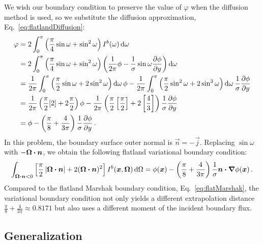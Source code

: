 \thesisclearpage
We wish our boundary condition to preserve the value of
$\varphi$ when the diffusion method is used, so we substitute the diffusion
approximation, Eq.~\eqref{eq:flatlandDiffusion}:
\begin{align*}
 \varphi &= 2\int_{0}^{\pi} \left( \frac{\pi}{4} \sin\omega + \sin^2\omega \right)
 I^b(\omega) \mathop{}\!\mathrm{d}\omega
 \\
 &= 
  2\int_{0}^{\pi} \left( \frac{\pi}{4} \sin\omega + \sin^2\omega \right)
 \left( \frac{1}{2\pi} \phi -
  \frac{1}{\sigma} \sin\omega \frac{\partial \phi}{\partial y}\right)\mathop{}\!\mathrm{d}\omega
\\
 &= 
\frac{1}{2\pi} \int_{0}^{\pi} \left( \frac{\pi}{2} \sin\omega + 2 \sin^2\omega
\right)\mathop{}\!\mathrm{d}\omega
 \,\phi -
 \frac{1}{2\pi} \int_{0}^{\pi} \left( \frac{\pi}{2} \sin^2\omega + 2 \sin^3\omega \right)\mathop{}\!\mathrm{d}\omega
  \,\frac{1}{\sigma} \frac{\partial \phi}{\partial y}
  \\
 &= 
 \frac{1}{2\pi} \left( \frac{\pi}{2} [2] + 2 \frac{\pi}{2}
\right) \phi
-
\frac{1}{2\pi} \left( \frac{\pi}{2} \left[ \frac{\pi}{2} \right] + 2 \left[
\frac{4}{3} \right] \right) \frac{1}{\sigma} \frac{\partial \phi}{\partial y}
\\
 &= 
  \phi
- \left( \frac{\pi}{8} + \frac{4}{3\pi} \right) \frac{1}{\sigma} \frac{\partial \phi}{\partial y}
\,.
\end{align*}
In this problem, the boundary surface outer normal is $\vec{n}=-\vec{j}$. 
Replacing $\sin \omega$ with $-\bm{\Omega}\bm{\cdot}\bm{n}$, we obtain the following
flatland variational boundary condition:
\begin{equation} \label{eq:flatVarBc}
\int_{\bm{\Omega}\bm{\cdot}\bm{n} < 0} \left[ \frac{\pi}{2}
\left| \bm{\Omega}\bm{\cdot}\bm{n} \right| + 2 (\bm{\Omega}\bm{\cdot}\bm{n})^2 \right]
I^b(\bm{x}, \bm{\Omega}) \mathop{}\!\mathrm{d}\Omega
= 
  \phi(\bm{x})
  - \left( \frac{\pi}{8} + \frac{4}{3\pi} \right) \frac{1}{\sigma}
  \bm{n}\bm{\cdot}\bm{\nabla} \phi(\bm{x})\,.
\end{equation}
Compared to the flatland Marshak boundary condition,
Eq.~\eqref{eq:flatMarshak}, the variational boundary condition not only yields a
different extrapolation distance $\frac{\pi}{8} + \frac{4}{3\pi} \approx
0.8171$ but also uses a different moment of the incident boundary flux.

\subsection{Generalization}\label{sec:flatlandV}


